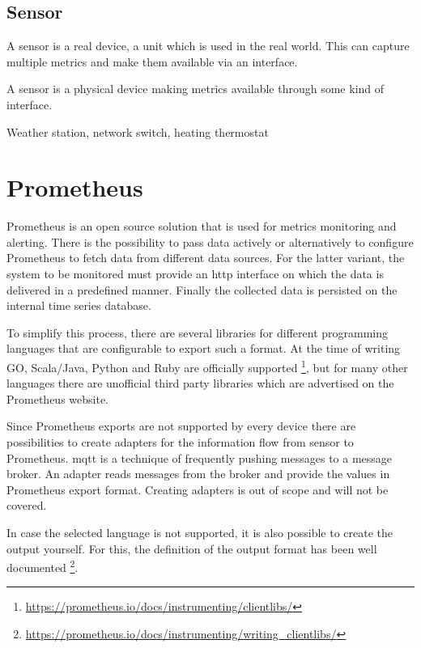 \subsection{Sensor}

A sensor is a real device, a unit which is used in the real world. This can capture multiple metrics and make them available via an interface.

\begin{Definition}
	A sensor is a physical device making metrics available through some kind of interface.
\end{Definition}

\begin{Beispiel}
	Weather station, network switch, heating thermostat
\end{Beispiel}

\section{Prometheus}

Prometheus is an open source solution that is used for metrics monitoring and alerting. There is the possibility to pass data actively or alternatively to configure Prometheus to fetch data from different data sources. For the latter variant, the system to be monitored must provide an \gls{http} interface on which the data is delivered in a predefined manner. Finally the collected data is persisted on the internal time series database.

To simplify this process, there are several libraries for different programming languages that are configurable to export such a format. At the time of writing GO, Scala/Java, Python and Ruby are officially supported \footnote{\url{https://prometheus.io/docs/instrumenting/clientlibs/}}, but for many other languages there are unofficial third party libraries which are advertised on the Prometheus website. 

Since Prometheus exports are not supported by every device there are possibilities to create adapters for the information flow from sensor to Prometheus. \gls{mqtt} is a technique of frequently pushing messages to a message broker. An adapter reads messages from the broker and provide the values in Prometheus export format. Creating adapters is out of scope and will not be covered.

In case the selected language is not supported, it is also possible to create the output yourself. For this, the definition of the output format has been well documented \footnote{\url{https://prometheus.io/docs/instrumenting/writing_clientlibs/}}.

